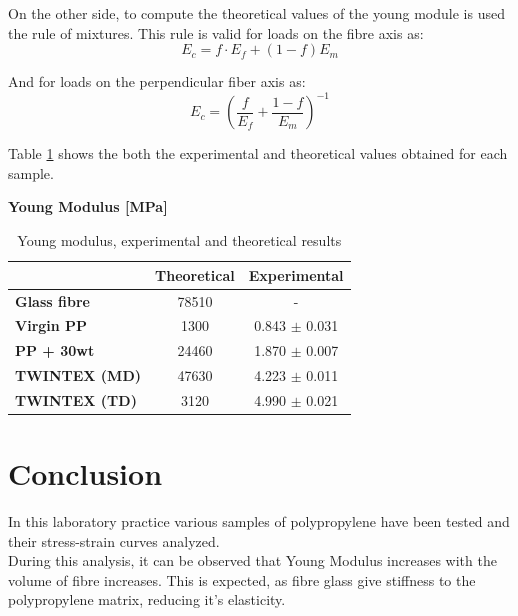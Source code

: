 On the other side, to compute the theoretical values of the young module is used the rule of mixtures. This rule is valid for loads on the fibre axis as:\\

\begin{equation}
E_c=f\cdot E_f + (1-f)E_m
\end{equation}

And for loads on the perpendicular fiber axis as:\\

\begin{equation}
E_c=\left(\dfrac{f}{E_f}+\dfrac{1-f}{E_m}\right)^{-1}
\end{equation}

Table \ref{tab:youngmodulus} shows the both the experimental and theoretical values obtained for each sample.\\

\begin{table}[]
\centering
\textbf{Young Modulus {[}MPa{]}} \\
\begin{tabular}{lcc}
\hline
\multicolumn{1}{c}{}  & \multicolumn{1}{l}{\textbf{Theoretical}} & \textbf{Experimental} \\ \hline
\textbf{Glass fibre} & 78510 & -\\ \hline
\textbf{Virgin PP} & 1300 & 0.843  $\pm$ 0.031 \\ \hline
\textbf{PP + 30wt} & 24460 & 1.870 $\pm$ 0.007 \\ \hline
\textbf{TWINTEX (MD)} & 47630 & 4.223 $\pm$ 0.011 \\ \hline
\textbf{TWINTEX (TD)} & 3120 & 4.990 $\pm$ 0.021 \\ \hline
\end{tabular}
\caption{Young modulus, experimental and theoretical results}
\label{tab:youngmodulus}
\end{table}

\newpage
\section{Conclusion}

In this laboratory practice various samples of polypropylene have been tested and their stress-strain curves analyzed.\\

During this analysis, it can be observed that Young Modulus increases with the volume of fibre increases. This is expected, as fibre glass give stiffness to the polypropylene matrix, reducing it's elasticity.\\

